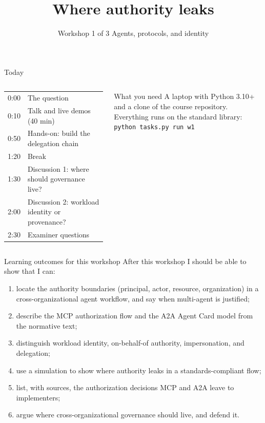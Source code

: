 \documentclass[aspectratio=169, 10pt]{beamer}
\title{Where authority leaks}
\subtitle{Workshop 1 of 3 \textperiodcentered{} Agents, protocols, and identity}
\date{\prep{set the workshop date}}
\begin{document}
\maketitle

\begin{frame}{Today}
  \begin{columns}[T]
    \small
    \begin{tabular}{@{}l l@{}}
      0:00 & The question \\
      0:10 & Talk and live demos (40 min) \\
      0:50 & Hands-on: build the delegation chain \\
      1:20 & Break \\
      1:30 & Discussion 1: where should governance live? \\
      2:00 & Discussion 2: workload identity or provenance? \\
      2:30 & Examiner questions \\
    \end{tabular}
    \begin{block}{What you need}
      \small A laptop with Python 3.10+ and a clone of the course repository.
      Everything runs on the standard library:\\[2pt]
      {\footnotesize\texttt{python tasks.py run w1}}
    \end{block}
  \end{columns}
\end{frame}

\begin{frame}{Learning outcomes for this workshop}
  \small After this workshop I should be able to show that I can:
  \begin{enumerate}
    \item[K1.1] locate the authority boundaries (principal, actor, resource, organization) in a cross-organizational agent workflow, and say when multi-agent is justified;
    \item[K1.2] describe the MCP authorization flow and the A2A Agent Card model from the normative text;
    \item[K1.3] distinguish workload identity, on-behalf-of authority, impersonation, and delegation;
    \item[S1.4] use a simulation to show where authority leaks in a standards-compliant flow;
    \item[S1.5] list, with sources, the authorization decisions MCP and A2A leave to implementers;
    \item[J1.6] argue where cross-organizational governance should live, and defend it.
  \end{enumerate}
\end{frame}
\end{document}
